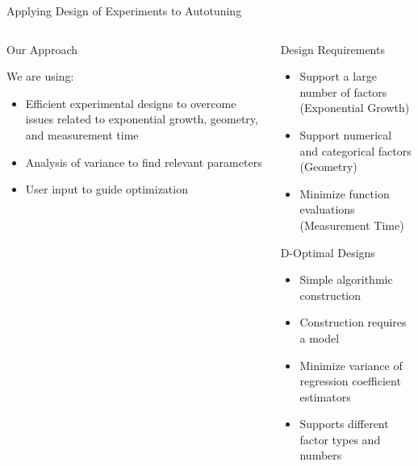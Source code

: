 \documentclass[10pt, compress, aspectratio=169, xcolor={table,usenames,dvipsnames}]{beamer}
\begin{document}
\begin{frame}[label={sec:orgd2ea3eb}]{Applying Design of Experiments to Autotuning}
\begin{columns}
\begin{column}{0.5\columnwidth}
\begin{block}{Our Approach}
\vspace{.2cm}

We are using:

\begin{itemize}
\item \alert{Efficient experimental designs} to overcome issues related to \alert{exponential growth}, \alert{geometry}, and \alert{measurement time}
\item \alert{Analysis of variance} to find \alert{relevant parameters}
\item \alert{User input} to guide optimization
\end{itemize}

\vspace{2cm}
\end{block}
\end{column}

\begin{column}{0.5\columnwidth}
\begin{block}{Design Requirements}
\begin{itemize}
\item Support a large number of factors (\alert{Exponential Growth})
\item Support numerical and categorical factors (\alert{Geometry})
\item Minimize function evaluations (\alert{Measurement Time})
\end{itemize}

\begin{block}{D-Optimal Designs}
\begin{itemize}
\item Simple \alert{algorithmic construction}
\item Construction requires a \alert{model}
\item Minimize \alert{variance} of \alert{regression coefficient estimators}
\item Supports different factor \alert{types} and \alert{numbers}
\end{itemize}
\end{block}
\end{block}
\end{column}
\end{columns}
\end{frame}
\end{document}
